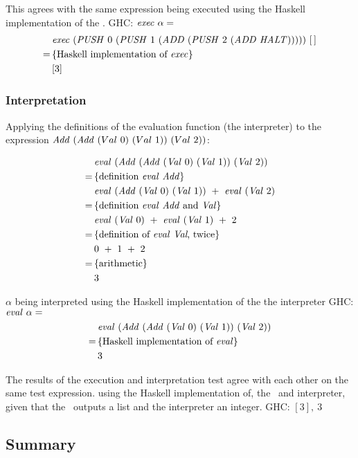 \documentclass {article}
\begin{document}
This agrees with the same expression being executed
using the Haskell implementation of the \vm.
GHC: \( \mathit{exec\ } \alpha =\)
\begin{align*}
&\mathit{exec\ } (\mathit{PUSH\ } 0\ (\mathit{PUSH\ } 1\ (\mathit{ADD\ }  (\mathit{PUSH\ } 2\ (\mathit{ADD\ }  \mathit{HALT})))))\ [\, ] \\
=\, & \{ \mbox{Haskell implementation of \textit{exec}} \} \\
&[3] 
\end{align*}

\subsubsection{Interpretation}

Applying the definitions of the evaluation function (the interpreter) to the expression
\( \Add (\Add (Val\ 0)\ (Val\ 1))\ (Val\ 2)) \):

\begin{align*}
	&\mathit{eval\ }  (\mathit{Add\ } (\mathit{Add\ } (\mathit{Val\ } 0)\ (\mathit{Val\ } 1))\ (\mathit{Val\ } 2)) \\
	=\, & \{ \mbox{definition \textit{eval}\ \textit{Add}} \} \\
	&\mathit{eval\ }  (\mathit{Add\ } (\mathit{Val\ } 0)\ (\mathit{Val\ } 1))\ +\ \mathit{eval\ }  (\mathit{Val\ } 2) \\
	=\, & \{ \mbox{definition \textit{eval}\ \textit{Add}\ and \textit{Val}} \} \\
	&\mathit{eval\ }  (\mathit{Val\ } 0)\ +\ \mathit{eval\ }  (\mathit{Val\ } 1)\ +\ 2 \\
	=\, & \{ \mbox{definition of \textit{eval}\ \textit{Val}, twice} \} \\
	&0\ +\ 1\ +\ 2 \\
	=\, & \{ \mbox{arithmetic} \} \\
	&3
\end{align*}

$\alpha$ being interpreted
using the Haskell implementation of the the interpreter
GHC: \( \mathit{eval\ } \alpha = \)
\begin{align*}
&\mathit{eval\ } (\mathit{Add\ } (\mathit{Add\ } (\mathit{Val\ } 0)\ (\mathit{Val\ } 1))\ (\mathit{Val\ } 2)) \\
=\, & \{ \mbox{Haskell implementation of \textit{eval}} \} \\
&3
\end{align*}

The results of the execution and interpretation test
agree with each other on the same test expression.
using the Haskell implementation of, the \vm\ and interpreter,
given that the \vm\ outputs a list and the interpreter an integer.
GHC: \( [3],\ 3 \)

\subsection{Summary}
\end{document}
